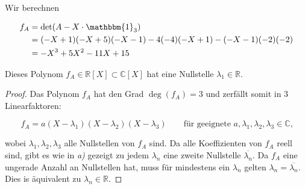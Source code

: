 \documentclass{article}
\newcommand{\RR}{\mathbb{R}}
\newcommand{\CC}{\mathbb{C}}
\begin{document}
Wir berechnen

\[
\begin{aligned}
  f_A
  &=
  \det(A - X \cdot \mathbbm{1}_3 ) \\
  &=
  (-X+1)(-X+5)(-X-1)-4(-4)(-X+1)-(-X-1)(-2)(-2)\\
  &=
  -X^3+5X^2-11X+15
\end{aligned}
\]

Dieses Polynom $f_A \in \RR[X] \subset \CC[X]$
hat eine Nullstelle $\lambda_1 \in \RR$.

\begin{proof}
  Das Polynom $f_A$ hat den Grad $\deg(f_A) = 3$
  und zerfällt somit in $3$ Linearfaktoren:

  \[
  f_A = a(X - \lambda_1)(X - \lambda_2)(X - \lambda_3) \qquad
  \text{für geeignete $a,\lambda_1,\lambda_2,\lambda_3 \in \CC$,}
  \]

  wobei $\lambda_1,\lambda_2,\lambda_3$
  alle Nullstellen von $f_A$ sind.
  Da alle Koeffizienten von $f_A$ reell sind, gibt es wie in
  \textit{a)} gezeigt zu jedem $\lambda_n$ eine
  zweite Nullstelle $\overline{\lambda_n}$.
  Da $f_A$ eine ungerade Anzahl an Nullstellen hat,
  muss für mindestens ein $\lambda_n$
  gelten $\lambda_n = \overline{\lambda_n}$.
  Dies is äquivalent zu $\lambda_n \in \RR$.
\end{proof}
\end{document}
